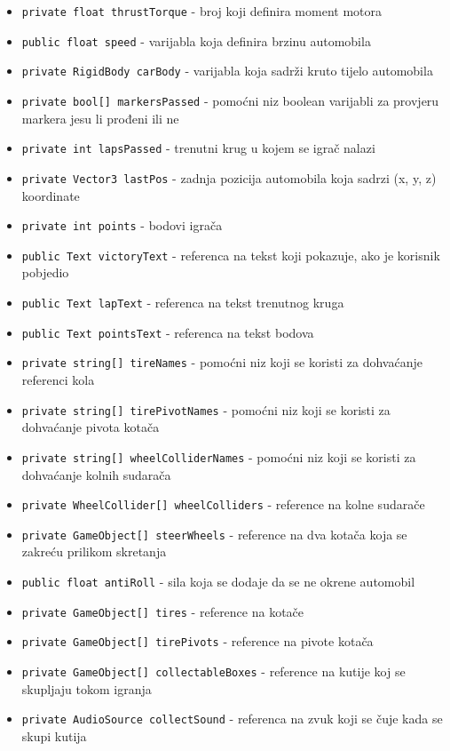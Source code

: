 \begin{itemize}
  \item \texttt{private float thrustTorque} - broj koji definira moment motora
  \item \texttt{public float speed} - varijabla koja definira brzinu automobila
  \item \texttt{private RigidBody carBody} - varijabla koja sadrži kruto tijelo automobila
  \item \texttt{private bool[] markersPassed} - pomoćni niz boolean varijabli za provjeru markera jesu li prođeni ili ne
  \item \texttt{private int lapsPassed} - trenutni krug u kojem se igrač nalazi
  \item \texttt{private Vector3 lastPos} - zadnja pozicija automobila koja sadrzi (x, y, z) koordinate
  \item \texttt{private int points} - bodovi igrača
  \item \texttt{public Text victoryText} - referenca na tekst koji pokazuje, ako je korisnik pobjedio
  \item \texttt{public Text lapText} - referenca na tekst trenutnog kruga
  \item \texttt{public Text pointsText} - referenca na tekst bodova 
  \item \texttt{private string[] tireNames} - pomoćni niz koji se koristi za dohvaćanje referenci kola
  \item \texttt{private string[] tirePivotNames} - pomoćni niz koji se koristi za dohvaćanje pivota kotača
  \item \texttt{private string[] wheelColliderNames} - pomoćni niz koji se koristi za dohvaćanje kolnih sudarača
  \item \texttt{private WheelCollider[] wheelColliders} - reference na kolne sudarače
  \item \texttt{private GameObject[] steerWheels} - reference na dva kotača koja se zakreću prilikom skretanja
  \item \texttt{public float antiRoll} - sila koja se dodaje da se ne okrene automobil
  \item \texttt{private GameObject[] tires} - reference na kotače
  \item \texttt{private GameObject[] tirePivots} - reference na pivote kotača
  \item \texttt{private GameObject[] collectableBoxes} - reference na kutije koj se skupljaju tokom igranja
  \item \texttt{private AudioSource collectSound} - referenca na zvuk koji se čuje kada se skupi kutija
\end{itemize}
\newpage
